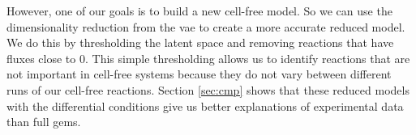 However, one of our goals is to build a new cell-free model.
So we can use the dimensionality reduction from the \gls{vae}  to create a more accurate reduced model.
We do this by thresholding the latent space and removing reactions that have fluxes close to 0.
This simple thresholding allows us to identify reactions that are not important in cell-free systems because they do not vary between different runs of our cell-free reactions.
Section \ref{sec:cmp} shows that these reduced models with the differential conditions give us better explanations of experimental data than full \glspl{gem}.
